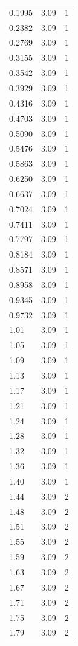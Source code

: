 \begin{longtable}{lrr}
  0.1995 & 3.09 & 1 \\
  0.2382 & 3.09 & 1 \\
  0.2769 & 3.09 & 1 \\
  0.3155 & 3.09 & 1 \\
  0.3542 & 3.09 & 1 \\
  0.3929 & 3.09 & 1 \\
  0.4316 & 3.09 & 1 \\
  0.4703 & 3.09 & 1 \\
  0.5090 & 3.09 & 1 \\
  0.5476 & 3.09 & 1 \\
  0.5863 & 3.09 & 1 \\
  0.6250 & 3.09 & 1 \\
  0.6637 & 3.09 & 1 \\
  0.7024 & 3.09 & 1 \\
  0.7411 & 3.09 & 1 \\
  0.7797 & 3.09 & 1 \\
  0.8184 & 3.09 & 1 \\
  0.8571 & 3.09 & 1 \\
  0.8958 & 3.09 & 1 \\
  0.9345 & 3.09 & 1 \\
  0.9732 & 3.09 & 1 \\
  1.01 & 3.09 & 1 \\
  1.05 & 3.09 & 1 \\
  1.09 & 3.09 & 1 \\
  1.13 & 3.09 & 1 \\
  1.17 & 3.09 & 1 \\
  1.21 & 3.09 & 1 \\
  1.24 & 3.09 & 1 \\
  1.28 & 3.09 & 1 \\
  1.32 & 3.09 & 1 \\
  1.36 & 3.09 & 1 \\
  1.40 & 3.09 & 1 \\
  1.44 & 3.09 & 2 \\
  1.48 & 3.09 & 2 \\
  1.51 & 3.09 & 2 \\
  1.55 & 3.09 & 2 \\
  1.59 & 3.09 & 2 \\
  1.63 & 3.09 & 2 \\
  1.67 & 3.09 & 2 \\
  1.71 & 3.09 & 2 \\
  1.75 & 3.09 & 2 \\
  1.79 & 3.09 & 2 \\

\end{longtable}
